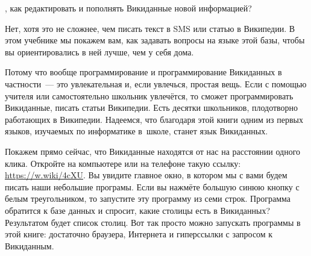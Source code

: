 , 
как редактировать и пополнять Викиданные новой информацией? 

Нет, хотя это не сложнее, чем писать текст в SMS 
или статью в Википедии. В этом учебнике мы покажем вам, 
как задавать вопросы на языке этой базы, 
чтобы вы ориентировались в ней лучше, чем у себя дома. 


Потому что вообще программирование и программирование Викиданных в частности~--- это 
увлекательная и, если увлечься, простая вещь. 
Если с помощью учителя или самостоятельно школьник увлечётся, 
то сможет программировать Викиданные, писать статьи Википедии. 
Есть десятки школьников, плодотворно работающих в Википедии. 
Надеемся, что благодаря этой книги одним из первых языков, 
изучаемых по информатике в~школе, станет язык Викиданных.

Покажем прямо сейчас, что Викиданные находятся от нас на расстоянии одного клика.
Откройте на компьютере или на телефоне такую ссылку: 
\url{https://w.wiki/4cXU}. 
Вы увидите главное окно, в котором мы с вами будем писать наши небольшие програмы. 
Если вы нажмёте большую синюю кнопку с белым треугольником, 
то запустите 
эту программу из семи строк. Программа обратится к базе данных 
и спросит, какие столицы есть в Викиданных?
Результатом будет список столиц. %
Вот так просто можно запускать программы в этой книге: достаточно браузера, 
Интернета и гиперссылки с запросом к Викиданным.
